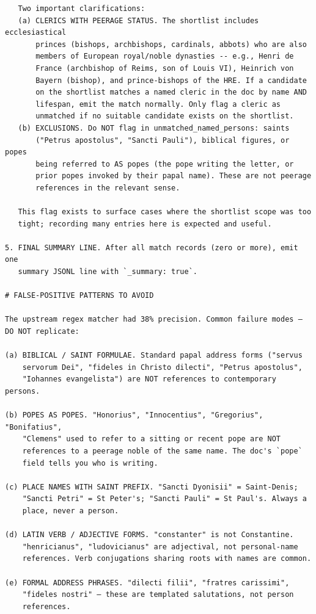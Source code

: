 \documentclass[12pt]{article}
\theoremstyle{definition}
\theoremstyle{remark}
\begin{document}
{\begin{verbatim}
   Two important clarifications:
   (a) CLERICS WITH PEERAGE STATUS. The shortlist includes ecclesiastical
       princes (bishops, archbishops, cardinals, abbots) who are also
       members of European royal/noble dynasties -- e.g., Henri de
       France (archbishop of Reims, son of Louis VI), Heinrich von
       Bayern (bishop), and prince-bishops of the HRE. If a candidate
       on the shortlist matches a named cleric in the doc by name AND
       lifespan, emit the match normally. Only flag a cleric as
       unmatched if no suitable candidate exists on the shortlist.
   (b) EXCLUSIONS. Do NOT flag in unmatched_named_persons: saints
       ("Petrus apostolus", "Sancti Pauli"), biblical figures, or popes
       being referred to AS popes (the pope writing the letter, or
       prior popes invoked by their papal name). These are not peerage
       references in the relevant sense.

   This flag exists to surface cases where the shortlist scope was too
   tight; recording many entries here is expected and useful.

5. FINAL SUMMARY LINE. After all match records (zero or more), emit one
   summary JSONL line with `_summary: true`.

# FALSE-POSITIVE PATTERNS TO AVOID

The upstream regex matcher had 38% precision. Common failure modes —
DO NOT replicate:

(a) BIBLICAL / SAINT FORMULAE. Standard papal address forms ("servus
    servorum Dei", "fideles in Christo dilecti", "Petrus apostolus",
    "Iohannes evangelista") are NOT references to contemporary persons.

(b) POPES AS POPES. "Honorius", "Innocentius", "Gregorius", "Bonifatius",
    "Clemens" used to refer to a sitting or recent pope are NOT
    references to a peerage noble of the same name. The doc's `pope`
    field tells you who is writing.

(c) PLACE NAMES WITH SAINT PREFIX. "Sancti Dyonisii" = Saint-Denis;
    "Sancti Petri" = St Peter's; "Sancti Pauli" = St Paul's. Always a
    place, never a person.

(d) LATIN VERB / ADJECTIVE FORMS. "constanter" is not Constantine.
    "henricianus", "ludovicianus" are adjectival, not personal-name
    references. Verb conjugations sharing roots with names are common.

(e) FORMAL ADDRESS PHRASES. "dilecti filii", "fratres carissimi",
    "fideles nostri" — these are templated salutations, not person
    references.


\end{verbatim}}
\end{document}
